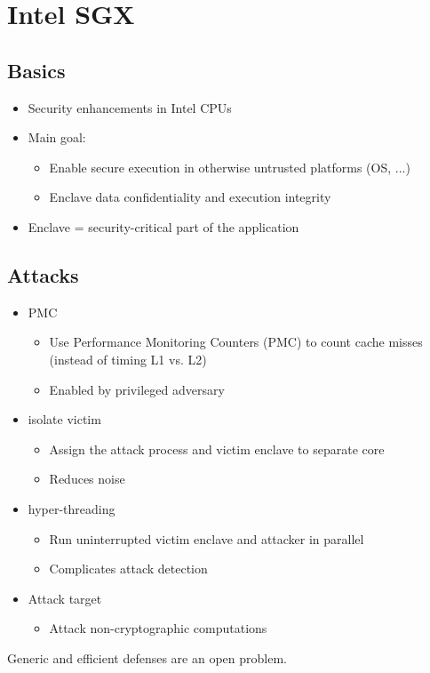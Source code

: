 
\section{Intel SGX}
\subsection{Basics}
\begin{itemize}
  \item Security enhancements in Intel CPUs
  \item Main goal:
    \begin{itemize}
      \item Enable secure execution in otherwise untrusted platforms (OS, ...)
      \item Enclave data confidentiality and execution integrity
    \end{itemize}
  \item Enclave = security-critical part of the application
\end{itemize}

\subsection{Attacks}
\begin{itemize}
  \item  PMC
    \begin{itemize}
      \item Use Performance Monitoring Counters (PMC) to count cache misses
	(instead of timing L1 vs. L2)
      \item Enabled by privileged adversary
      \end{itemize}
  \item  isolate victim
    \begin{itemize}
      \item Assign the attack process and victim enclave to separate core
      \item Reduces noise
      \end{itemize}
  \item  hyper-threading
    \begin{itemize}
      \item Run uninterrupted victim enclave and attacker in parallel
      \item Complicates attack detection
      \end{itemize}
  \item Attack target
    \begin{itemize}
      \item Attack non-cryptographic computations
      \end{itemize}
\end{itemize}
Generic and efficient defenses  are an open problem.
